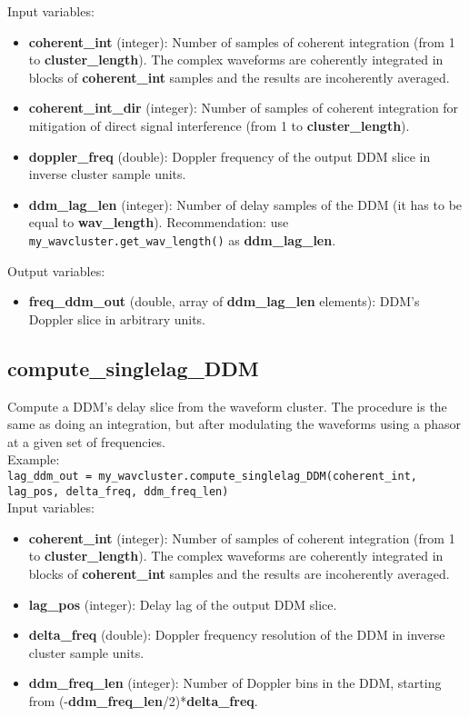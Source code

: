 Input variables:
\begin{itemize}
\item {\bf coherent\_int} (integer): Number of samples of coherent integration (from 1 to {\bf cluster\_length}). The complex waveforms are coherently integrated in blocks of {\bf coherent\_int} samples and the results are incoherently averaged.
\item {\bf coherent\_int\_dir} (integer): Number of samples of coherent integration for mitigation of direct signal interference (from 1 to {\bf cluster\_length}).
\item {\bf doppler\_freq} (double): Doppler frequency of the output DDM slice in inverse cluster sample units.
\item {\bf ddm\_lag\_len} (integer): Number of delay samples of the DDM (it has to be equal to {\bf wav\_length}). Recommendation: use \texttt{my\_wavcluster.get\_wav\_length()} as {\bf ddm\_lag\_len}.
\end{itemize}

Output variables:
\begin{itemize}
\item {\bf freq\_ddm\_out} (double, array of {\bf ddm\_lag\_len} elements): DDM's Doppler slice in arbitrary units.
\end{itemize}


\subsection{compute\_singlelag\_DDM}

Compute a DDM's delay slice from the waveform cluster. The procedure is the same as doing an integration, but after modulating the waveforms using a phasor at a given set of frequencies.\\

Example:\\

\texttt{lag\_ddm\_out = my\_wavcluster.compute\_singlelag\_DDM(coherent\_int, lag\_pos, delta\_freq, ddm\_freq\_len)}\\

Input variables:
\begin{itemize}
\item {\bf coherent\_int} (integer): Number of samples of coherent integration (from 1 to {\bf cluster\_length}). The complex waveforms are coherently integrated in blocks of {\bf coherent\_int} samples and the results are incoherently averaged.
\item {\bf lag\_pos} (integer): Delay lag of the output DDM slice.
\item {\bf delta\_freq} (double): Doppler frequency resolution of the DDM in inverse cluster sample units.
\item {\bf ddm\_freq\_len} (integer): Number of Doppler bins in the DDM, starting from (-{\bf ddm\_freq\_len}/2)*{\bf delta\_freq}.
\end{itemize}

